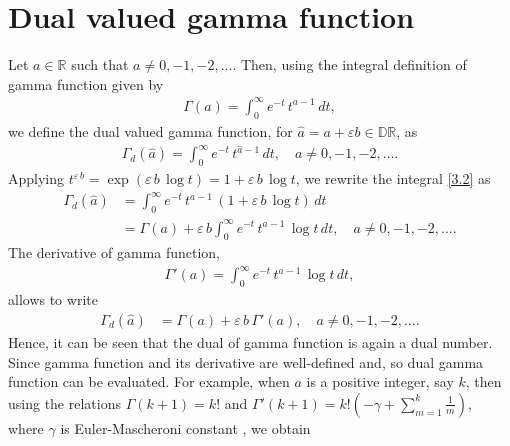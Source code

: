 \documentclass[11pt,a4paper,fleqn]{article}
\numberwithin{equation}{section}
\numberwithin{lemma}{section}
\numberwithin{theorem}{section}
\numberwithin{corollary}{section}
\begin{document}
\section{Dual valued gamma function}
Let $a \in \mathbb{R}$ such that $a \ne 0, -1, -2, \dots$. Then, using the integral definition of gamma function given by \cite{d24,emo}
\begin{align}
	\Gamma (a) = \int_{0}^{\infty} e^{-t} \, t^{a - 1} \, dt, \label{3.1}
\end{align}
we define the dual valued gamma function,  for $\widehat{a} = a + \varepsilon b \in \mathbb{D}\mathbb{R}$, as
\begin{align}
	\Gamma_d (\widehat{a}) = \int_{0}^{\infty} e^{-t} \, t^{\widehat{a} - 1} \, dt, \quad a \ne 0, -1, -2, \dots. \label{3.2}
\end{align}
Applying $t^{\varepsilon \, b} = \exp (\varepsilon \, b \, \log t) = 1 + \varepsilon \, b \, \log t$, we rewrite the integral \eqref{3.2} as 
\begin{align}
	\Gamma_d (\widehat{a}) & = \int_{0}^{\infty} e^{-t} \, t^{{a} - 1} \, (1 + \varepsilon \, b \, \log t) \, dt\nonumber\\
	& = \Gamma (a) +   \varepsilon \, b  \int_{0}^{\infty} e^{-t} \, t^{{a} - 1} \,  \log t \, dt, \quad a \ne 0, -1, -2, \dots.
\end{align}
The derivative of gamma function,
\begin{align}
	\Gamma' (a) = \int_{0}^{\infty} e^{-t} \, t^{a - 1} \, \log t \, dt,
\end{align} 
allows to write 
\begin{align}
	\Gamma_d (\widehat{a}) & =   \Gamma (a) +   \varepsilon \, b  \, \Gamma' (a), \quad a \ne 0, -1, -2, \dots.\label{e3.6}
\end{align}
Hence, it can be seen that the dual of gamma function is again a dual number. Since gamma function and its derivative are well-defined and, so dual gamma function can be evaluated. For example, when $a$ is a positive integer, say $k$, then using the relations $\Gamma (k + 1) = k !$ and $\Gamma' (k + 1) = k! \left(-\gamma + \sum_{m = 1}^{k} \frac{1}{m}\right)$, where $\gamma$ is Euler-Mascheroni constant \cite{emo}, we obtain
\end{document}

